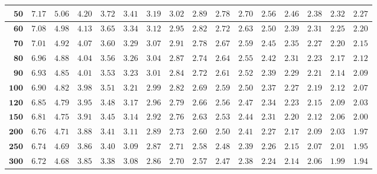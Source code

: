 \begin{longtable}{|r|r|r|r|r|r|r|r|r|r|r|r|r|r|r|r|}
    \(\mathbf{50}\) & \(7.17\) & \(5.06\) & \(4.20\) & \(3.72\) & \(3.41\) & \(3.19\) & \(3.02\) & \(2.89\) & \(2.78\) & \(2.70\) & \(2.56\) & \(2.46\) & \(2.38\) & \(2.32\) & \(2.27\) \\ \hline 
    \(\mathbf{60}\) & \(7.08\) & \(4.98\) & \(4.13\) & \(3.65\) & \(3.34\) & \(3.12\) & \(2.95\) & \(2.82\) & \(2.72\) & \(2.63\) & \(2.50\) & \(2.39\) & \(2.31\) & \(2.25\) & \(2.20\) \\ \hline 
    \(\mathbf{70}\) & \(7.01\) & \(4.92\) & \(4.07\) & \(3.60\) & \(3.29\) & \(3.07\) & \(2.91\) & \(2.78\) & \(2.67\) & \(2.59\) & \(2.45\) & \(2.35\) & \(2.27\) & \(2.20\) & \(2.15\) \\ \hline 
    \(\mathbf{80}\) & \(6.96\) & \(4.88\) & \(4.04\) & \(3.56\) & \(3.26\) & \(3.04\) & \(2.87\) & \(2.74\) & \(2.64\) & \(2.55\) & \(2.42\) & \(2.31\) & \(2.23\) & \(2.17\) & \(2.12\) \\ \hline 
    \(\mathbf{90}\) & \(6.93\) & \(4.85\) & \(4.01\) & \(3.53\) & \(3.23\) & \(3.01\) & \(2.84\) & \(2.72\) & \(2.61\) & \(2.52\) & \(2.39\) & \(2.29\) & \(2.21\) & \(2.14\) & \(2.09\) \\ \hline 
    \(\mathbf{100}\) & \(6.90\) & \(4.82\) & \(3.98\) & \(3.51\) & \(3.21\) & \(2.99\) & \(2.82\) & \(2.69\) & \(2.59\) & \(2.50\) & \(2.37\) & \(2.27\) & \(2.19\) & \(2.12\) & \(2.07\) \\ \hline 
    \(\mathbf{120}\) & \(6.85\) & \(4.79\) & \(3.95\) & \(3.48\) & \(3.17\) & \(2.96\) & \(2.79\) & \(2.66\) & \(2.56\) & \(2.47\) & \(2.34\) & \(2.23\) & \(2.15\) & \(2.09\) & \(2.03\) \\ \hline 
    \(\mathbf{150}\) & \(6.81\) & \(4.75\) & \(3.91\) & \(3.45\) & \(3.14\) & \(2.92\) & \(2.76\) & \(2.63\) & \(2.53\) & \(2.44\) & \(2.31\) & \(2.20\) & \(2.12\) & \(2.06\) & \(2.00\) \\ \hline 
    \(\mathbf{200}\) & \(6.76\) & \(4.71\) & \(3.88\) & \(3.41\) & \(3.11\) & \(2.89\) & \(2.73\) & \(2.60\) & \(2.50\) & \(2.41\) & \(2.27\) & \(2.17\) & \(2.09\) & \(2.03\) & \(1.97\) \\ \hline 
    \(\mathbf{250}\) & \(6.74\) & \(4.69\) & \(3.86\) & \(3.40\) & \(3.09\) & \(2.87\) & \(2.71\) & \(2.58\) & \(2.48\) & \(2.39\) & \(2.26\) & \(2.15\) & \(2.07\) & \(2.01\) & \(1.95\) \\ \hline 
    \(\mathbf{300}\) & \(6.72\) & \(4.68\) & \(3.85\) & \(3.38\) & \(3.08\) & \(2.86\) & \(2.70\) & \(2.57\) & \(2.47\) & \(2.38\) & \(2.24\) & \(2.14\) & \(2.06\) & \(1.99\) & \(1.94\) \\ \hline 

\end{longtable}
